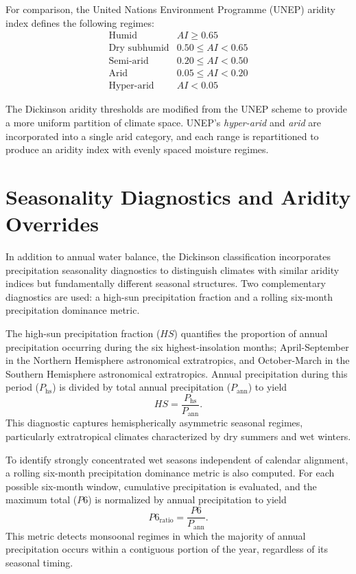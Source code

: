 \documentclass[12pt]{article}
\begin{document}
For comparison, the United Nations Environment Programme (UNEP) aridity
index defines the following regimes:
\[
\begin{array}{ll}
\text{Humid}            & AI \ge 0.65 \\
\text{Dry subhumid}     & 0.50 \le AI < 0.65 \\
\text{Semi-arid}        & 0.20 \le AI < 0.50 \\
\text{Arid}             & 0.05 \le AI < 0.20 \\
\text{Hyper-arid}       & AI < 0.05
\end{array}
\]

The Dickinson aridity thresholds are modified from the UNEP
scheme to provide a more uniform partition of climate space. UNEP's \textit{hyper-arid} and \textit{arid} are incorporated into a single arid category, and each range is
repartitioned to produce an aridity index with evenly spaced moisture
regimes.

\section{Seasonality Diagnostics and Aridity Overrides}

In addition to annual water balance, the Dickinson classification
incorporates precipitation seasonality diagnostics to distinguish climates
with similar aridity indices but fundamentally different seasonal
structures. Two complementary diagnostics are used: a high-sun
precipitation fraction and a rolling six-month precipitation dominance
metric.

The high-sun precipitation fraction ($HS$) quantifies the proportion of
annual precipitation occurring during the six highest-insolation months; April-September in the Northern Hemisphere astronomical extratropics, and October-March in the Southern Hemisphere astronomical extratropics. Annual precipitation during this period ($P_{\text{hs}}$) is divided by
total annual precipitation ($P_{\text{ann}}$) to yield
\[
HS = \frac{P_{\text{hs}}}{P_{\text{ann}}}.
\]
This diagnostic captures hemispherically asymmetric seasonal regimes, particularly extratropical climates characterized by dry summers and wet winters.

To identify strongly concentrated wet seasons independent of calendar
alignment, a rolling six-month precipitation dominance metric is also
computed. For each possible six-month window, cumulative precipitation is
evaluated, and the maximum total ($P6$) is normalized by annual
precipitation to yield
\[
P6_{\text{ratio}} = \frac{P6}{P_{\text{ann}}}.
\]
This metric detects monsoonal regimes in which the majority of annual
precipitation occurs within a contiguous portion of the year, regardless
of its seasonal timing.
\end{document}
